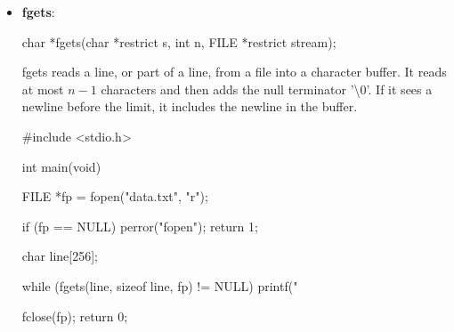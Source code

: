 \documentclass{report}
\begin{document}
\begin{itemize}
\begin{cppcode}
                int main(void) {
                    FILE *fp = fopen("data.txt", "r");

                    if (fp == NULL) {
                        perror("fopen");
                        return 1;
                    }

                    int ch;

                    while ((ch = fgetc(fp)) != EOF) {
                        putchar(ch);
                    }

                    fclose(fp);
                    return 0;
                }
            \end{cppcode}
        \item \textbf{fgets}: 
            \begin{cppcode}
                char *fgets(char *restrict s, int n, FILE *restrict stream);
            \end{cppcode}
            \bigbreak \noindent 
            fgets reads a line, or part of a line, from a file into a character buffer.
            \bigbreak \noindent 
            It reads at most $n - 1$ characters and then adds the null terminator '\textbackslash 0'.
            \bigbreak \noindent 
            If it sees a newline before the limit, it includes the newline in the buffer.
            \bigbreak \noindent 
            \begin{cppcode}
                #include <stdio.h>

                int main(void) {
                    FILE *fp = fopen("data.txt", "r");

                    if (fp == NULL) {
                        perror("fopen");
                        return 1;
                    }

                    char line[256];

                    while (fgets(line, sizeof line, fp) != NULL) {
                        printf("%
                    }

                    fclose(fp);
                    return 0;
                }
            \end{cppcode}









    \end{itemize}






    
\end{document}
